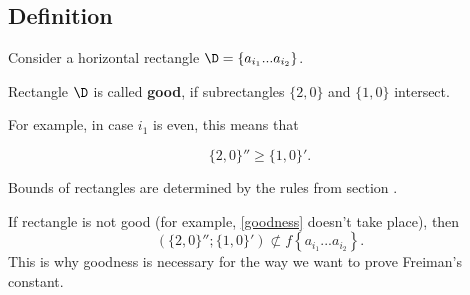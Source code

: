 \subsection{Definition}

Consider a horizontal rectangle $\D = \left\{ a_{i_1} ... a_{i_2} \right\}$.

\begin{definition}
	Rectangle $\D$ is called \textbf{good},
	if subrectangles
	$\{2, 0\}$ and $\{1, 0\}$ intersect.
\end{definition}


For example, in case $i_1$ is even, this means that

\begin{equation}\label{goodness}
	\{2, 0\}'' \geqslant \{1, 0\}'.
\end{equation}

Bounds of rectangles are determined by the rules from section .

If rectangle is not good (for example, \ref{goodness} doesn't take place), then
$$ ( \{2, 0\}'' ; \{1, 0\}' ) \not\subset
f \left\{ a_{i_1} ... a_{i_2} \right\}. $$
This is why goodness is necessary for the way we want to prove Freiman's constant.
